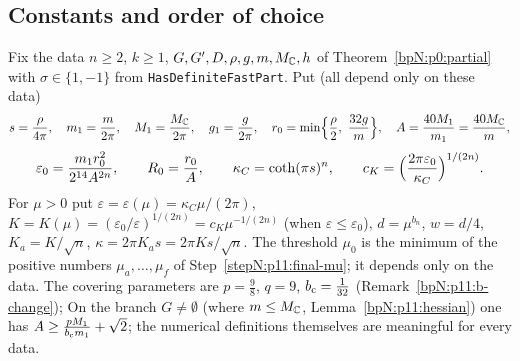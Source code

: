 \subsection{Constants and order of choice}\label{bpN:p11:s-const}

\begin{definition}\label{bpN:p11:constants}
Fix the data $n\ge2$, $k\ge1$, $G,G',D,\rho,g,m,M_{\mathbb{C}},h$ of Theorem~\ref{bpN:p0:partial} with $\sigma\in\{1,-1\}$ from \texttt{HasDefiniteFastPart}. Put (all depend only on these data)
\[s=\frac\rho{4\pi},\quad m_1=\frac m{2\pi},\quad M_1=\frac{M_{\mathbb{C}}}{2\pi},\quad g_1=\frac g{2\pi},\quad r_0=\min\Bigl\{\frac\rho2,\ \frac{32g}m\Bigr\},\quad A=\frac{40M_1}{m_1}=\frac{40M_{\mathbb{C}}}m,\]
\[\varepsilon_0=\frac{m_1r_0^2}{2^{14}A^{2n}},\qquad R_0=\frac{r_0}A,\qquad\kappa_C=\coth(\pi s)^n,\qquad c_K=\Bigl(\frac{2\pi\varepsilon_0}{\kappa_C}\Bigr)^{1/(2n)}.\]
For $\mu>0$ put $\varepsilon=\varepsilon(\mu)=\kappa_C\mu/(2\pi)$, $K=K(\mu)=(\varepsilon_0/\varepsilon)^{1/(2n)}=c_K\mu^{-1/(2n)}$ (when $\varepsilon\le\varepsilon_0$), $d=\mu^{b_n}$, $w=d/4$, $K_a=K/\sqrt n$, $\kappa=2\pi K_as=2\pi Ks/\sqrt n$.
The threshold $\mu_0$ is the minimum of the positive numbers $\mu_a,\dots,\mu_f$ of Step~\ref{stepN:p11:final-mu}; it depends only on the data. The covering parameters are $p=\frac98$, $q=9$, $b_{\rm c}=\frac1{32}$ (Remark~\ref{bpN:p11:b-change}); On the branch $G\ne\emptyset$ (where $m\le M_{\mathbb{C}}$, Lemma~\ref{bpN:p11:hessian}) one has $A\ge\frac{pM_1}{b_{\rm c}m_1}+\sqrt2$; the numerical definitions themselves are meaningful for every data.
\end{definition}
\endgroup
